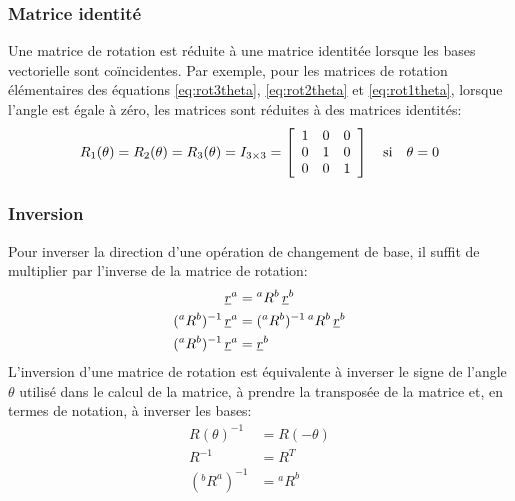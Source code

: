 \subsubsection{Matrice identité}
Une matrice de rotation est réduite à une matrice identitée lorsque les bases vectorielle sont coïncidentes. Par exemple, pour les matrices de rotation élémentaires des équations \eqref{eq:rot3theta}, \eqref{eq:rot2theta} et \eqref{eq:rot1theta}, lorsque l'angle est égale à zéro, les matrices sont réduites à des matrices identités:
\begin{align}
R_1( \theta ) = R_2( \theta ) = R_3( \theta ) = I_{3\times3} = 
\left[ \begin{array}{c c c}
	1 & 0 & 0 \\
	0 & 1 & 0 \\
	0 & 0 & 1 
\end{array}  \right]  \quad\text{si}\quad \theta = 0
\label{eq:rot3thetaident}
\end{align}

\subsubsection{Inversion}

Pour inverser la direction d'une opération de changement de base, il suffit de multiplier par l'inverse de la matrice de rotation:
\begin{align}
\underline{r}^a &= {}^aR^b \, \underline{r}^b \\
({}^aR^b)^{-1} \, \underline{r}^a &= ({}^aR^b)^{-1} \, {}^aR^b \, \underline{r}^b  \\
({}^aR^b)^{-1} \, \underline{r}^a &= \underline{r}^b
\end{align}
L'inversion d'une matrice de rotation est équivalente à inverser le signe de l'angle $\theta$ utilisé dans le calcul de la matrice, à prendre la transposée de la matrice et, en termes de notation, à inverser les bases:
\begin{align}
R(\theta)^{-1} &= R(-\theta) \\
R^{-1} &= R^T \\
({}^bR^a)^{-1} &= {}^aR^b
\end{align}


